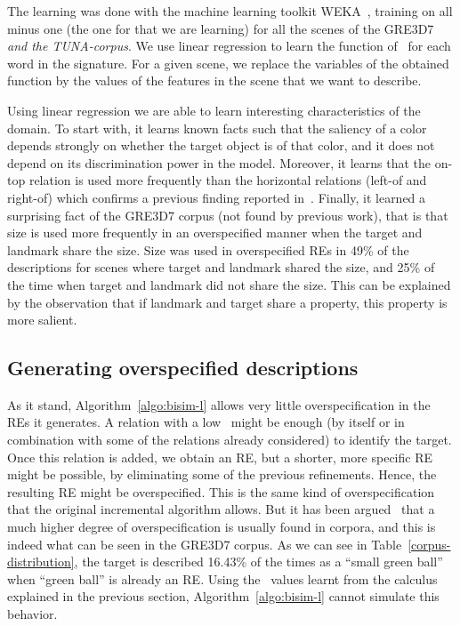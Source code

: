 The learning was done with the machine learning toolkit
WEKA~\cite{Hall:WEK09}, training on all minus one (the one for that we
are learning) for all the scenes of the GRE3D7 \textit{and the
  TUNA-corpus}.  We use linear regression to learn the function of
\puse\ for each word in the signature.  For a given scene, we replace
the variables of the obtained function by the values of the features
in the scene that we want to describe.

Using linear regression we are able to learn interesting
characteristics of the domain. To start with, it learns known facts
such that the saliency of a color depends strongly on whether the
target object is of that color, and it does not depend on its
discrimination power in the model. Moreover, it learns that the on-top
relation is used more frequently than the horizontal relations
(left-of and right-of) which confirms a previous finding reported
in~\cite{viet:gene11}. Finally, it learned a surprising fact of the
GRE3D7 corpus (not found by previous work), that is that size is used
more frequently in an overspecified manner when the target and
landmark share the size. Size was used in overspecified REs in 49\% of
the descriptions for scenes where target and landmark shared the size,
and 25\% of the time when target and landmark did not share the
size. This can be explained by the observation that if landmark and
target share a property, this property is more salient.



\subsection{Generating overspecified descriptions}\label{sec:overspecification}

As it stand, Algorithm~\ref{algo:bisim-l} allows very little overspecification in the REs it
generates.  A relation with a low \puse\ might be enough 
(by itself or in combination with some of the relations already considered) to 
identify the target. Once this relation is added, we obtain an RE, but a shorter, 
more specific RE might be possible, by eliminating some of the previous refinements. 
Hence, the resulting RE might be overspecified. This is the same kind of overspecification 
that the original incremental algorithm allows.  But it has been argued~\cite{Engelhardt_Bailey_Ferreira_2006,Arts_Maes_Noordman_Jansen_2011} that 
a much higher degree of overspecification is usually found in corpora, and this 
is indeed what can be seen in the GRE3D7 corpus.  As we can see in Table~\ref{corpus-distribution}, 
the target is described 16.43\% of the times as a ``small green ball'' when ``green 
ball'' is already an RE.  Using the \puse\ values learnt from the calculus explained
in the previous section, Algorithm~\ref{algo:bisim-l} cannot simulate this behavior. 

